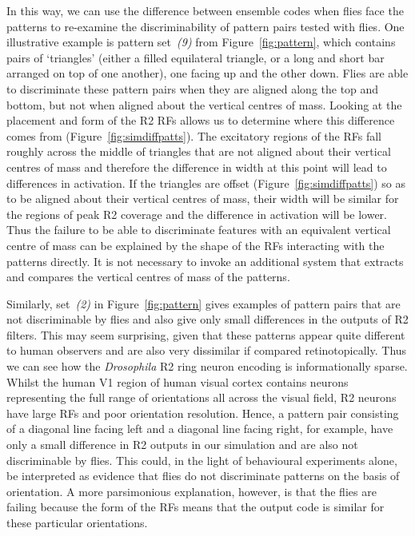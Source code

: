 In this way, we can use the difference between ensemble codes when flies face the patterns to re-examine the discriminability of pattern pairs tested with flies. One illustrative example is pattern set~\emph{(9)} from Figure~\ref{fig:pattern}, which contains pairs of ‘triangles’ (either a filled equilateral triangle, or a long and short bar arranged on top of one another), one facing up and the other down. Flies are able to discriminate these pattern pairs when they are aligned along the top and bottom, but not when aligned about the vertical centres of mass\cite{Ernst1999}. Looking at the placement and form of the R2 RFs allows us to determine where this difference comes from (Figure~\ref{fig:simdiffpatts}). The excitatory regions of the RFs fall roughly across the middle of triangles that are not aligned about their vertical centres of mass and therefore the difference in width at this point will lead to differences in activation. If the triangles are offset (Figure~\ref{fig:simdiffpatts}) so as to be aligned about their vertical centres of mass, their width will be similar for the regions of peak R2 coverage and the difference in activation will be lower. Thus the failure to be able to discriminate features with an equivalent vertical centre of mass can be explained by the shape of the RFs interacting with the patterns directly. It is not necessary to invoke an additional system that extracts and compares the vertical centres of mass of the patterns.

Similarly, set~\emph{(2)} in Figure~\ref{fig:pattern} gives examples of pattern pairs that are not discriminable by flies and also give only small differences in the outputs of R2 filters. This may seem surprising, given that these patterns appear quite different to human observers and are also very dissimilar if compared retinotopically. Thus we can see how the \emph{Drosophila} R2 ring neuron encoding is informationally sparse. Whilst the human V1 region of human visual cortex contains neurons representing the full range of orientations all across the visual field, R2 neurons have large RFs and poor orientation resolution. Hence, a pattern pair consisting of a diagonal line facing left and a diagonal line facing right, for example, have only a small difference in R2 outputs in our simulation and are also not discriminable by flies. This could, in the light of behavioural experiments alone, be interpreted as evidence that flies do not discriminate patterns on the basis of orientation. A more parsimonious explanation, however, is that the flies are failing because the form of the RFs means that the output code is similar for these particular orientations.

